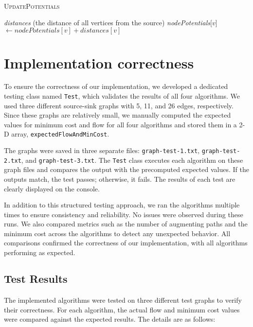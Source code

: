 \documentclass{article}
\begin{document}
\begin{algorithm}[H]
\caption{\textcolor{keywordcolor}{\textsc{UpdatePotentials}}}
\begin{algorithmic}[1]
\State {} \textit{distances} (the distance of all vertices from the source)
        \State \textit{nodePotentials}[$v$] $\gets \textit{nodePotentials}[v] + \textit{distances}[v]$
    \EndIf
\EndFor
\end{algorithmic}
\end{algorithm}

\section{Implementation correctness}

To ensure the correctness of our implementation, we developed a dedicated testing class named \texttt{Test}, which validates the results of all four algorithms. We used three different source-sink graphs with 5, 11, and 26 edges, respectively. Since these graphs are relatively small, we manually computed the expected values for minimum cost and flow for all four algorithms and stored them in a 2-D array, \texttt{expectedFlowAndMinCost}. 

The graphs were saved in three separate files: \texttt{graph-test-1.txt}, \texttt{graph-test-2.txt}, and \texttt{graph-test-3.txt}. The \texttt{Test} class executes each algorithm on these graph files and compares the output with the precomputed expected values. If the outputs match, the test passes; otherwise, it fails. The results of each test are clearly displayed on the console.

In addition to this structured testing approach, we ran the algorithms multiple times to ensure consistency and reliability. No issues were observed during these runs. We also compared metrics such as the number of augmenting paths and the minimum cost across the algorithms to detect any unexpected behavior. All comparisons confirmed the correctness of our implementation, with all algorithms performing as expected.

\subsection{Test Results}
\paragraph{}
The implemented algorithms were tested on three different test graphs to verify their correctness. For each algorithm, the actual flow and minimum cost values were compared against the expected results. The details are as follows:
\end{document}
